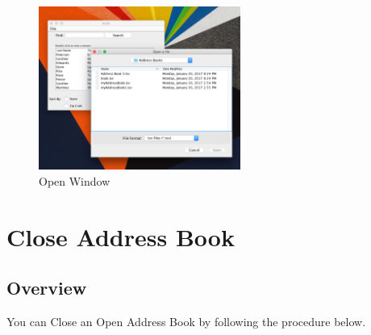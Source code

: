 \documentclass[a4paper, 11pt]{article}
\begin{document}
\begin{enumerate}[label=\textbf{\arabic*})]
    \begin{figure}[h!]
    \centering
      \includegraphics[width=250]{open_window.png}
      \caption{Open Window}
    \end{figure}
    
\end{enumerate}

\clearpage

\section{Close Address Book}
\subsection{Overview}
You can Close an Open Address Book by following the procedure below.
\end{document}
